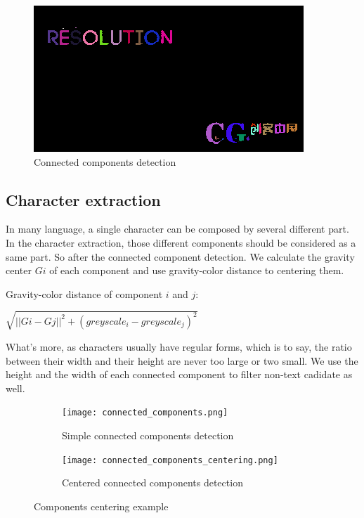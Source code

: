 \documentclass[paper=a4, french, 11pt]{scrartcl}
\begin{document}
\begin{figure}[h]
\begin{center}
   \includegraphics[width=0.6\linewidth]{connected_components_example.png}
\end{center}
\vspace{-4ex}
\caption{Connected components detection}
\label{fig:heatmap}
\end{figure}

\subsection{Character extraction} \mbox{} \vspace{-0.5cm}

In many language, a single character can be composed by several different part. In the character extraction, those different components should be considered as a same part. So after the connected component detection. We calculate the gravity center $G{i}$ of each component and use gravity-color distance to centering them.

Gravity-color distance of component $ i$ and $ j$:

$\sqrt{||G{i}-G{j}||^2 + (greyscale_{i} - greyscale_{j})^2}$

What's more, as characters usually have regular forms, which is to say, the ratio between their width and their height are never too large or two small. We use the height and the width of each connected component to filter non-text cadidate as well. 

\begin{figure}[h]
\begin{subfigure}{0.5\textwidth}
\centering
\texttt{[image: connected\_components.png]}
\caption{Simple connected components detection}
\end{subfigure}%
\begin{subfigure}{0.5\textwidth}
\centering
\texttt{[image: connected\_components\_centering.png]}
\caption{Centered connected components detection}
\end{subfigure}
\caption{Components centering example}
\label{fig:Centering}
\end{figure} 
\end{document}

